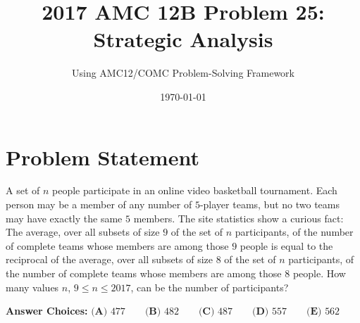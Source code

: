 \documentclass[]{article}
\title{\textbf{2017 AMC 12B Problem 25: Strategic Analysis}}
\author{Using AMC12/COMC Problem-Solving Framework}
\date{\today}
\begin{document}
	\maketitle
	
	\section*{Problem Statement}
	
	A set of $n$ people participate in an online video basketball tournament. Each person may be a member of any number of $5$-player teams, but no two teams may have exactly the same $5$ members. The site statistics show a curious fact: The average, over all subsets of size $9$ of the set of $n$ participants, of the number of complete teams whose members are among those $9$ people is equal to the reciprocal of the average, over all subsets of size $8$ of the set of $n$ participants, of the number of complete teams whose members are among those $8$ people. How many values $n$, $9\leq n\leq 2017$, can be the number of participants?
	
	\textbf{Answer Choices:} 
	$\textbf{(A) } 477 \qquad \textbf{(B) } 482 \qquad \textbf{(C) } 487 \qquad \textbf{(D) } 557 \qquad \textbf{(E) } 562$
	
\end{document}
